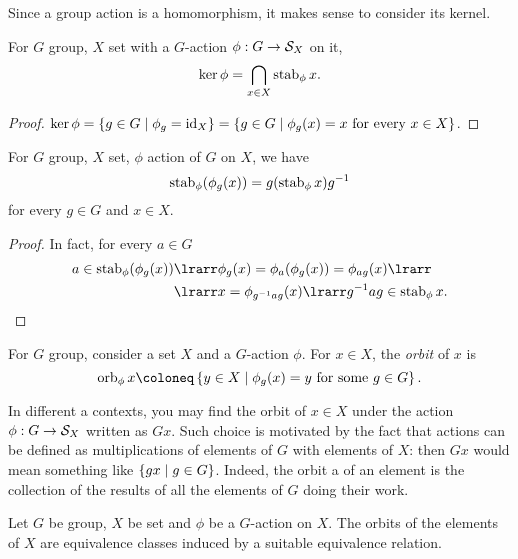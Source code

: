 Since a group action is a homomorphism, it makes sense to consider its kernel.

\begin{proposition}
For \(G\) group, \(X\) set with a \(G\)-action \(\phi : G \to \mathcal S_X\) on it,
\[\ker \phi = \bigcap_{x \in X} \operatorname{stab}_\phi x .\]
\end{proposition}

\begin{proof}
\(\ker \phi = \left\{g \in G \mid \phi_g = \text{id}_X\right\} = \left\{g \in G \mid \phi_g(x) = x \text{ for every } x \in X\right\}\).
\end{proof}

\begin{proposition}
For \(G\) group, \(X\) set, \(\phi\) action of \(G\) on \(X\), we have
\[\operatorname{stab}_\phi(\phi_g (x)) = g (\operatorname{stab}_\phi x) g^{-1}\]
for every \(g \in G\) and \(x \in X\). 
\end{proposition}

\begin{proof}
In fact, for every \(a \in G\)
\begin{align*}
a \in \stab_\phi (\phi_g (x)) & \lrarr \phi_g (x) = \phi_a (\phi_g (x)) = \phi_{ag} (x) \lrarr \\
& \lrarr x = \phi_{\inv g a g} (x) \lrarr \inv g a g \in \stab_\phi x . \qedhere
\end{align*}
\end{proof}

\begin{definition}
For \(G\) group, consider a set \(X\) and a \(G\)-action \(\phi\). For \(x \in X\), the {\em orbit} of \(x\) is
\[\orb_\phi x \coloneq \set{y \in X \mid \phi_g(x) = y \text{ for some } g \in G}.\]
\end{definition}

In different a contexts, you may find the orbit of \(x \in X\) under the action \(\phi : G \to \mathcal S_X\) written as \(Gx\). Such choice is motivated by the fact that actions can be defined as multiplications of elements of \(G\) with elements of \(X\): then \(Gx\) would mean something like \(\left\{gx \mid g \in G\right\}\). Indeed, the orbit a of an element is the collection of the results of all the elements of \(G\) doing their work.

\begin{proposition}
Let \(G\) be group, \(X\) be set and \(\phi\) be a \(G\)-action on \(X\). The orbits of the elements of \(X\) are equivalence classes induced by a suitable equivalence relation.
\end{proposition}

